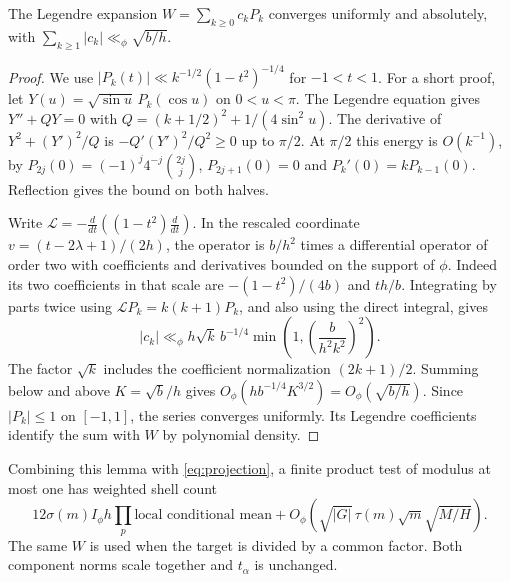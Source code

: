 \begin{lemma}\label{lem:bump}
The Legendre expansion \(W=\sum_{k\ge0}c_kP_k\) converges
uniformly and absolutely, with \(\sum_{k\ge1}|c_k|\ll_\phi\sqrt{b/h}\).
\end{lemma}
\begin{proof}
We use \(|P_k(t)|\ll k^{-1/2}(1-t^2)^{-1/4}\) for \(-1<t<1\).
For a short proof, let \(Y(u)=\sqrt{\sin u}\,P_k(\cos u)\) on
\(0<u<\pi\). The Legendre equation gives \(Y''+QY=0\) with
\(Q=(k+1/2)^2+1/(4\sin^2u)\).
The derivative of \(Y^2+(Y')^2/Q\) is
\(-Q'(Y')^2/Q^2\ge0\) up to \(\pi/2\). At \(\pi/2\) this energy
is \(O(k^{-1})\), by \(P_{2j}(0)=(-1)^j4^{-j}\binom{2j}{j}\),
\(P_{2j+1}(0)=0\) and \(P_k'(0)=kP_{k-1}(0)\).
Reflection gives the bound on both halves.

Write \(\mathcal L=-\frac d{dt}((1-t^2)\frac d{dt})\).
In the rescaled coordinate \(v=(t-2\lambda+1)/(2h)\), the operator
is \(b/h^2\) times a differential operator of order two with
coefficients and derivatives bounded on the support of \(\phi\).
Indeed its two coefficients in that scale are
\(-(1-t^2)/(4b)\) and \(th/b\). Integrating by parts twice
using \(\mathcal L P_k=k(k+1)P_k\), and also using the direct integral,
gives
\[
 |c_k|\ll_\phi h\sqrt{k}\,b^{-1/4}
       \min\!\left(1,\left(\frac{b}{h^2k^2}\right)^2\right).
\]
The factor \(\sqrt{k}\) includes the coefficient normalization
\((2k+1)/2\). Summing below and above \(K=\sqrt b/h\) gives
\(O_\phi(h b^{-1/4}K^{3/2})=O_\phi(\sqrt{b/h})\).
Since \(|P_k|\le1\) on \([-1,1]\), the series converges uniformly.
Its Legendre coefficients identify the sum with \(W\) by polynomial
density.
\end{proof}

Combining this lemma with \eqref{eq:projection}, a finite product
test of modulus at most one has weighted shell count
\begin{equation}\label{eq:angular}
 12\sigma(m)I_\phi h\prod_{p}\text{local conditional mean}
 +O_\phi\!\left(\sqrt{|G|}\,\tau(m)\sqrt m\sqrt{M/H}\right).
\end{equation}
The same \(W\) is used when the target is divided by a common factor.
Both component norms scale together and \(t_\alpha\) is unchanged.
